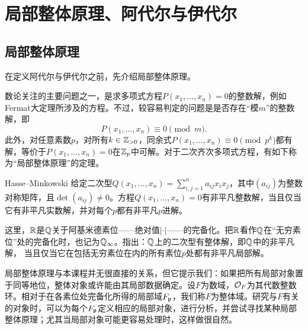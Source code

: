 \chapter{局部整体原理、阿代尔与伊代尔}\label{L3}
\section{局部整体原理}\label{L3S1}
在定义阿代尔与伊代尔之前，先介绍局部整体原理。

数论关注的主要问题之一，是求多项式方程$P(x_1,\ldots,x_n)=0$的整数解，例如Fermat大定理所涉及的方程。不过，较容易判定的问题是是否存在“模$m$”的整数解，即
\[P(x_1,\ldots,x_n)\equiv0\pmod m.\]
此外，对任意素数$p$，对所有$k\in\mathbb{Z}_{>0}$，同余式$P(x_1,\ldots,x_n)\equiv0\pmod{p^k}$都有解，等价于$P(x_1,\ldots,x_n)=0$在$\mathbb{Z}_p$中可解。对于二次齐次多项式方程，有如下称为“局部整体原理”的定理。
\begin{theorem}{Hasse--Minkowski}\label{L3S1O1}
给定二次型$Q(x_1,\ldots,x_n)=\sum_{i,j=1}^n a_{ij}x_ix_j$，其中$(a_{ij})$为整数对称矩阵，且$\det(a_{ij})\ne0$。方程$Q(x_1,\ldots,x_n)=0$有非平凡整数解，当且仅当它有非平凡实数解，并对每个$p$都有非平凡$p$进解。
\end{theorem}
这里，$\mathbb{R}$是$\mathbb{Q}$关于阿基米德素位——绝对值$|\cdot|$——的完备化。把$\mathbb{R}$看作$\mathbb{Q}$在“无穷素位”处的完备化时，也记为$\mathbb{Q}_\infty$。指出：$\mathbb{Q}$上的二次型有整体解，即$\mathbb{Q}$中的非平凡解，
当且仅当它在包括无穷素位在内的所有素位$p$处都有非平凡局部解。

局部整体原理与本课程并无很直接的关系，但它提示我们：如果把所有局部对象置于同等地位，整体对象或许能由其局部数据确定。设$F$为数域，$\mathcal O_F$为其代数整数环。相对于在各素位处完备化所得的局部域$F_{\mathfrak{p}}$，我们称$F$为整体域。研究与$F$有关的对象时，可以为每个$F_{\mathfrak{p}}$定义相应的局部对象，进行分析，并尝试寻找某种局部整体原理；尤其当局部对象可能更容易处理时，这样做很自然。

